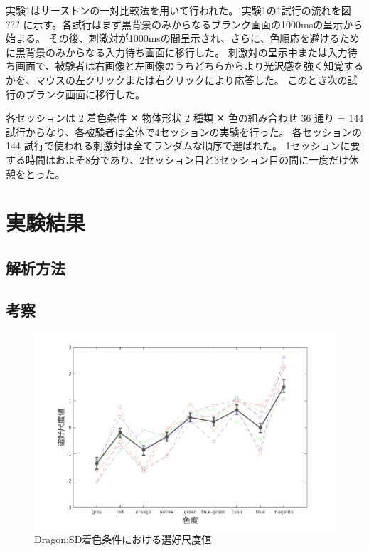         実験1はサーストンの一対比較法を用いて行われた。
        実験1の1試行の流れを図 ??? に示す。各試行はまず黒背景のみからなるブランク画面の1000msの呈示から始まる。
        その後、刺激対が1000msの間呈示され、さらに、色順応を避けるために黒背景のみからなる入力待ち画面に移行した。
        刺激対の呈示中または入力待ち画面で、被験者は右画像と左画像のうちどちらからより光沢感を強く知覚するかを、マウスの左クリックまたは右クリックにより応答した。
        このとき次の試行のブランク画面に移行した。

        各セッションは 2 着色条件 ✕ 物体形状 2 種類 ✕ 色の組み合わせ 36 通り = 144 試行からなり、各被験者は全体で4セッションの実験を行った。
        各セッションの 144 試行で使われる刺激対は全てランダムな順序で選ばれた。
        1セッションに要する時間はおよそ8分であり、2セッション目と3セッション目の間に一度だけ休憩をとった。



\section{実験結果}
    \subsection{解析方法}

    \subsection{考察}
        
        \begin{figure}
            \centering
            \includegraphics[width=14.0cm]{./img/ex1_res_DSD.png}
            \caption{Dragon:SD着色条件における選好尺度値}
            \label{ex1_DSD}
        \end{figure}

